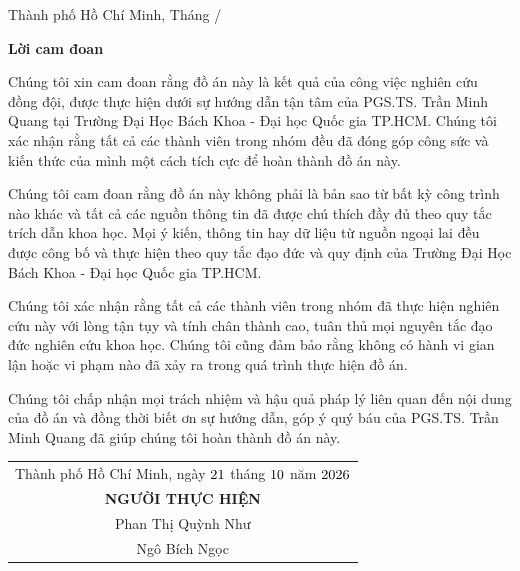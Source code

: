 \documentclass[12pt, a4paper]{report}
\theoremstyle{definition}
\newenvironment{declaration}{
	\begin{center}
	  {\bfseries Lời cam đoan}
	\end{center}
	\quotation
  }{}
\newcommand{\Proc}{PGS.TS. Trần Minh Quang }
\newcommand{\Uni}{Trường Đại Học Bách Khoa - Đại học Quốc gia TP.HCM}
\begin{document}
\begin{titlepage}
\begin{table}[h]
\begin{tabular}{rll}
\end{tabular}
\end{table}
\vspace{1cm}

\begin{center}
{\large Thành phố Hồ Chí Minh, Tháng \the\month/\the\year}
\end{center}
\end{titlepage}



\begin{declaration}

Chúng tôi xin cam đoan rằng đồ án này là kết quả của công việc nghiên cứu đồng đội, được thực hiện dưới sự hướng dẫn tận tâm của \Proc tại \Uni. Chúng tôi xác nhận rằng tất cả các thành viên trong nhóm đều đã đóng góp công sức và kiến thức của mình một cách tích cực để hoàn thành đồ án này.

Chúng tôi cam đoan rằng đồ án này không phải là bản sao từ bất kỳ công trình nào khác và tất cả các nguồn thông tin đã được chú thích đầy đủ theo quy tắc trích dẫn khoa học. Mọi ý kiến, thông tin hay dữ liệu từ nguồn ngoại lai đều được công bố và thực hiện theo quy tắc đạo đức và quy định của \Uni.

Chúng tôi xác nhận rằng tất cả các thành viên trong nhóm đã thực hiện nghiên cứu này với lòng tận tụy và tính chân thành cao, tuân thủ mọi nguyên tắc đạo đức nghiên cứu khoa học. Chúng tôi cũng đảm bảo rằng không có hành vi gian lận hoặc vi phạm nào đã xảy ra trong quá trình thực hiện đồ án.

Chúng tôi chấp nhận mọi trách nhiệm và hậu quả pháp lý liên quan đến nội dung của đồ án và đồng thời biết ơn sự hướng dẫn, góp ý quý báu của \Proc  đã giúp chúng tôi hoàn thành đồ án này.

\begin{flushright}

    \begin{tabular}{@{}c@{}}
    Thành phố Hồ Chí Minh, ngày $\the\day$  tháng $\the\month$ năm $\the\year$ \\
    \textbf{NGƯỜI THỰC HIỆN} \\
    Phan Thị Quỳnh Như \\
    Ngô Bích Ngọc
    \end{tabular}

\end{flushright}
\end{declaration}

\newpage
\end{document}
